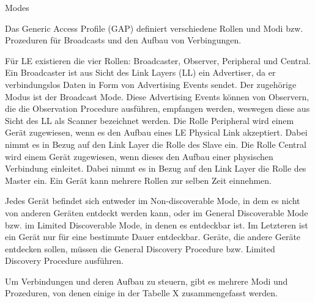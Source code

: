 Modes

Das Generic Access Profile (GAP) definiert verschiedene Rollen und Modi bzw. Prozeduren für Broadcasts und den Aufbau von Verbingungen.

Für LE existieren die vier Rollen: Broadcaster, Observer, Peripheral und Central. Ein Broadcaster ist aus Sicht des Link Layers (LL) ein Advertiser, da er verbindungslos Daten in Form von Advertising Events sendet. Der zugehörige Modus ist der Broadcast Mode. Diese Advertising Events können von Observern, die die Observation Procedure ausführen, empfangen werden, weswegen diese aus Sicht des LL als Scanner bezeichnet werden. Die Rolle Peripheral wird einem Gerät zugewiesen, wenn es den Aufbau eines LE Physical Link akzeptiert. Dabei nimmt es in Bezug auf den Link Layer die Rolle des Slave ein. Die Rolle Central wird einem Gerät zugewiesen, wenn dieses den Aufbau einer physischen Verbindung einleitet. Dabei nimmt es in Bezug auf den Link Layer die Rolle des Master ein. Ein Gerät kann mehrere Rollen zur selben Zeit einnehmen.

Jedes Gerät befindet sich entweder im Non-discoverable Mode, in dem es nicht von anderen Geräten entdeckt werden kann, oder im General Discoverable Mode bzw. im Limited Discoverable Mode, in denen es entdeckbar ist. Im Letzteren ist ein Gerät nur für eine bestimmte Dauer entdeckbar. Geräte, die andere Geräte entdecken sollen, müssen die General Discovery Procedure bzw. Limited Discovery Procedure ausführen.

Um Verbindungen und deren Aufbau zu steuern, gibt es mehrere Modi und Prozeduren, von denen einige in der Tabelle X zusammengefasst werden.

